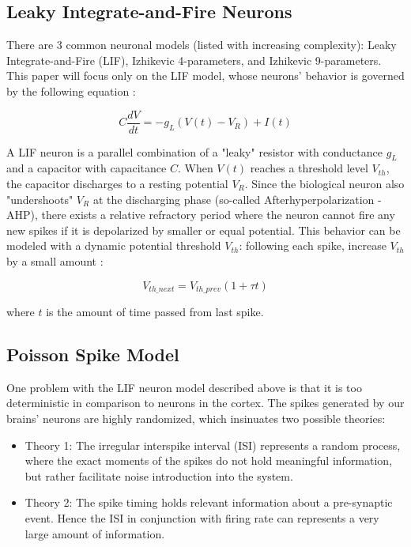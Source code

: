 \documentclass[11pt]{article}  %
\begin{document}
\subsection{Leaky Integrate-and-Fire Neurons}

There are 3 common neuronal models (listed with increasing complexity): Leaky Integrate-and-Fire (LIF), Izhikevic 4-parameters, and Izhikevic 9-parameters. This paper will focus only on the LIF model, whose neurons' behavior is governed by the following equation \cite{b5}:

\begin{equation}
	C\frac{dV}{dt} = -g_L(V(t) - V_R) + I(t)
	\label{eq1}
\end{equation}

A LIF neuron is a parallel combination of a "leaky" resistor with conductance $g_L$ and a capacitor with capacitance $C$. When $V(t)$ reaches a threshold level $V_{th}$, the capacitor discharges to a resting potential $V_R$. Since the biological neuron also "undershoots" $V_R$ at the discharging phase (so-called Afterhyperpolarization - AHP), there exists a relative refractory period where the neuron cannot fire any new spikes if it is depolarized by smaller or equal potential. This behavior can be modeled with a dynamic potential threshold $V_{th}$: following each spike, increase $V_{th}$ by a small amount \cite{b6}:

\begin{equation}
	V_{th\_next} = V_{th\_prev}(1+\tau t)
	\label{eq2}
\end{equation}

where $t$ is the amount of time passed from last spike. 

\subsection{Poisson Spike Model}

One problem with the LIF neuron model described above is that it is too deterministic in comparison to neurons in the cortex. The spikes generated by our brains' neurons are highly randomized, which insinuates two possible theories:

\begin{itemize}
	\item Theory 1: The irregular interspike interval (ISI) represents a random process, where the exact moments of the spikes do not hold meaningful information, but rather facilitate noise introduction into the system.
	\item Theory 2: The spike timing holds relevant information about a pre-synaptic event. Hence the ISI in conjunction with firing rate can represents a very large amount of information.
\end{itemize}
\end{document}
